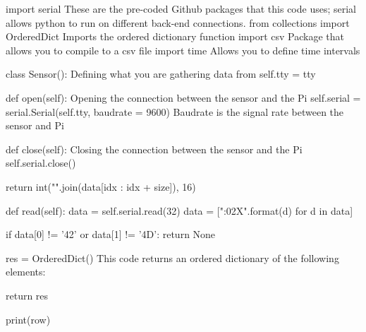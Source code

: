 \documentclass{article}
\begin{document}
import serial  These are the pre-coded Github packages that this code uses; serial allows python to run on different back-end connections.
from collections import OrderedDict  Imports the ordered dictionary function
import csv  Package that allows you to compile to a csv file
import time  Allows you to define time intervals

class Sensor(): Defining what you are gathering data from
    self.tty = tty
  
  def open(self):  Opening the connection between the sensor and the Pi
    self.serial = serial.Serial(self.tty, baudrate = 9600)  Baudrate is the signal rate between the sensor and Pi
  
  def close(self):  Closing the connection between the sensor and the Pi
    self.serial.close()
    
    return int("".join(data[idx : idx + size]), 16)
    
  def read(self): %
    data = self.serial.read(32)
    data = ["{:02X}".format(d) for d in data]
    
    if data[0] != '42' or data[1] != '4D':
      return None
      
    res = OrderedDict()  This code returns an ordered dictionary of the following elements:

    return res
    
                                print(row)
               
\end{document}
